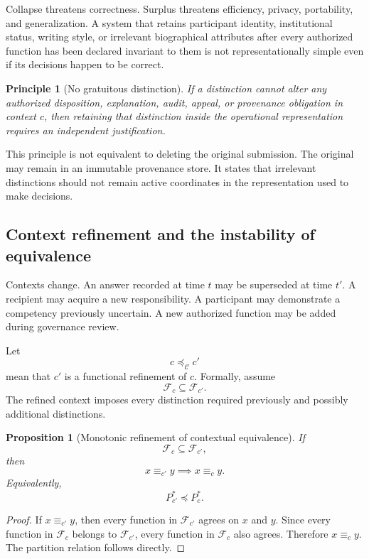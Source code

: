 \documentclass[11pt]{article}
\newtheorem{proposition}[definition]{Proposition}
\newtheorem{principle}[definition]{Principle}
\theoremstyle{definition}
\newcommand{\F}{\mathcal{F}}
\begin{document}
Collapse threatens correctness. Surplus threatens efficiency, privacy, portability, and generalization. A system that retains participant identity, institutional status, writing style, or irrelevant biographical attributes after every authorized function has been declared invariant to them is not representationally simple even if its decisions happen to be correct.

\begin{principle}[No gratuitous distinction]
If a distinction cannot alter any authorized disposition, explanation, audit, appeal, or provenance obligation in context \(c\), then retaining that distinction inside the operational representation requires an independent justification.
\end{principle}

This principle is not equivalent to deleting the original submission. The original may remain in an immutable provenance store. It states that irrelevant distinctions should not remain active coordinates in the representation used to make decisions.

\subsection{Context refinement and the instability of equivalence}

Contexts change. An answer recorded at time \(t\) may be superseded at time \(t'\). A recipient may acquire a new responsibility. A participant may demonstrate a competency previously uncertain. A new authorized function may be added during governance review.

Let
\[
c\preceq_{\mathcal C}c'
\]
mean that \(c'\) is a functional refinement of \(c\). Formally, assume
\[
\F_c\subseteq\F_{c'}.
\]
The refined context imposes every distinction required previously and possibly additional distinctions.

\begin{proposition}[Monotonic refinement of contextual equivalence]
If
\[
\F_c\subseteq\F_{c'},
\]
then
\[
x\equiv_{c'}y
\implies
x\equiv_c y.
\]
Equivalently,
\[
P_{c'}^{*}\preceq P_c^{*}.
\]
\end{proposition}

\begin{proof}
If \(x\equiv_{c'}y\), then every function in \(\F_{c'}\) agrees on \(x\) and \(y\). Since every function in \(\F_c\) belongs to \(\F_{c'}\), every function in \(\F_c\) also agrees. Therefore \(x\equiv_c y\). The partition relation follows directly.
\end{proof}
\end{document}
